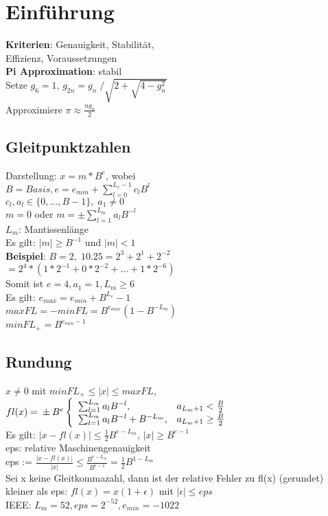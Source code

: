 \section{Einführung}
\textbf{Kriterien}: Genauigkeit, Stabilität,\\
Effizienz, Voraussetzungen\\
\textbf{Pi Approximation}: stabil\\
Setze $g_{6} = 1$, $g_{2n} = g_{n} \;/ \sqrt{2 +  \sqrt{4 - g_{n}^{2}}}$\\
Approximiere $\pi \approx \frac{ng_{n}}{2}$
\subsection{Gleitpunktzahlen}
Darstellung: $x = m * B^{e}$, wobei\\
$B = Basis, e = e_{min} + \sum_{l=0}^{L_{e}-1} c_{l}B^{l}$\\
$c_{l}, a_{l} \in \{0, ..., B-1\},\; a_{1} \neq 0$\\
$m = 0$ oder $ m = \pm \sum_{l=1}^{L_{m}} a_{l}B^{-l} $\\
$L_{m}$: Mantissenlänge\\
Es gilt: $|m| \geq B^{-1}$ und $|m| < 1$\\
\textbf{Beispiel}: $B = 2, \; 10.25 = 2^3 + 2^1 + 2^{-2}$\\
$ = 2^4 * (1*2^{-1} + 0*2^{-2} + ... + 1*2^{-6})$\\
Somit ist $ e = 4, a_{1} = 1, L_{m} \geq 6$\\
Es gilt: $e_{max} = e_{min} + B^{L_e} -1$\\
$maxFL = -minFL = B^{e_{max}}(1-B^{-L_m})$\\
$minFL_+ = B^{e_{min}-1}$
\subsection{Rundung}
$x \neq 0$ mit $minFL_+ \leq |x| \leq maxFL$, $fl(x) =\\ \pm B^e\left\{
\begin{array}{ll}
\sum_{l=1}^{L_{m}} a_{l}B^{-l}, & a_{L_m+1} < \frac{B}{2} \\
\sum_{l=1}^{L_{m}} a_{l}B^{-l} + B^{-L_m}, & a_{L_m+1} \geq \frac{B}{2} \\
\end{array}
\right. $\\
Es gilt: $|x - fl(x)| \leq \frac{1}{2}B^{e-L_m}$, $|x| \geq B^{e-1}$\\
eps: relative Maschinengenauigkeit\\
eps := $\frac{|x - fl(x)|}{|x|} \leq \frac{B^{e-L_m}}{B^{e-1}} = \frac{1}{2}B^{1-L_m}$\\
Sei x keine Gleitkommazahl, dann ist der relative Fehler zu fl(x) (gerundet) kleiner als eps: $fl(x) = x(1+\epsilon)$ mit $|\epsilon| \leq eps$\\
IEEE: $L_m = 52, eps = 2^{-52}, e_{min} = -1022$

